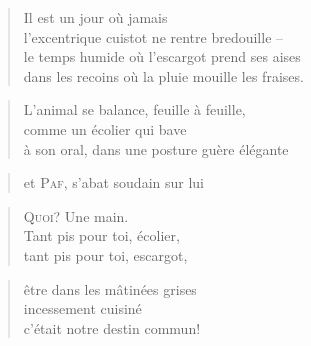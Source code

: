   \begin{verse}
    Il est un jour où jamais\\
    l’excentrique cuistot ne rentre bredouille --\\
    le temps humide où l’escargot prend ses aises\\
    dans les recoins où la pluie mouille les fraises.
  \end{verse}
  \begin{verse}
    L’animal se balance, feuille à feuille,\\
    comme un écolier qui bave\\
    à son oral, dans une posture guère élégante
  \end{verse}
  \begin{verse}
    et \textsc{Paf}, s’abat soudain sur lui
  \end{verse}
  \begin{verse}
    \textsc{Quoi?}
    Une main.\\
    Tant pis pour toi, écolier,\\
    tant pis pour toi, escargot,
  \end{verse}
  \begin{verse}
    être dans les mâtinées grises\\
    incessement cuisiné\\
    c’était notre destin commun!
  \end{verse}
